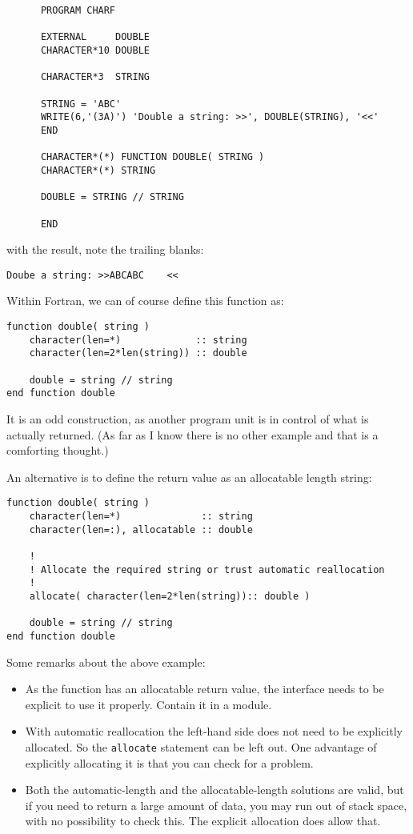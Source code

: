 \begin{verbatim}
      PROGRAM CHARF

      EXTERNAL     DOUBLE
      CHARACTER*10 DOUBLE

      CHARACTER*3  STRING

      STRING = 'ABC'
      WRITE(6,'(3A)') 'Double a string: >>', DOUBLE(STRING), '<<'
      END

      CHARACTER*(*) FUNCTION DOUBLE( STRING )
      CHARACTER*(*) STRING

      DOUBLE = STRING // STRING

      END
\end{verbatim}

\noindent with the result, note the trailing blanks:
\begin{verbatim}
Doube a string: >>ABCABC    <<
\end{verbatim}

Within Fortran, we can of course define this function as:
\begin{verbatim}
function double( string )
    character(len=*)             :: string
    character(len=2*len(string)) :: double

    double = string // string
end function double
\end{verbatim}

It is an odd construction, as another program unit is in control of what is actually returned.
(As far as I know there is no other example and that is a comforting thought.)

An alternative is to define the return value as an allocatable length string:

\begin{verbatim}
function double( string )
    character(len=*)              :: string
    character(len=:), allocatable :: double

    !
    ! Allocate the required string or trust automatic reallocation
    !
    allocate( character(len=2*len(string)):: double )

    double = string // string
end function double
\end{verbatim}

Some remarks about the above example:
\begin{itemize}
\item
As the function has an allocatable return value, the interface needs to be explicit to use it properly.
Contain it in a module.
\item
With automatic reallocation the left-hand side does not need to be explicitly allocated. So the \verb+allocate+
statement can be left out. One advantage of explicitly allocating it is that you can check for a problem.
\item
Both the automatic-length and the allocatable-length solutions are valid, but if you need to return
a large amount of data, you may run out of stack space, with no possibility to check this. The explicit
allocation does allow that.
\end{itemize}
